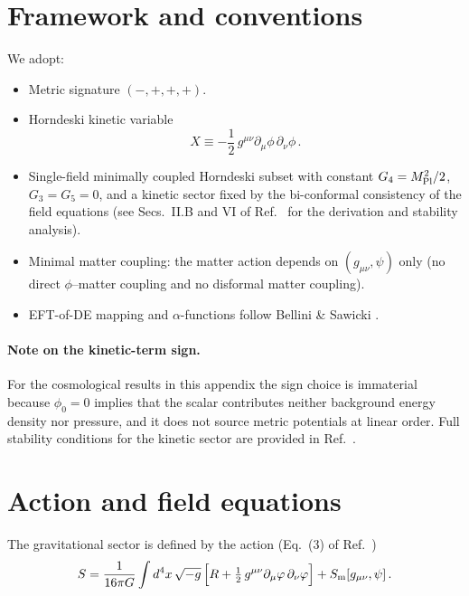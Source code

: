 \documentclass[11pt]{article}
\newcommand{\Mpl}{M_{\rm Pl}}
\begin{document}
\section{Framework and conventions}
\label{sec:conventions}

We adopt:
\begin{itemize}
\item Metric signature $(-,+,+,+)$.
\item Horndeski kinetic variable
\begin{equation}
X \equiv -\frac{1}{2}\,g^{\mu\nu}\partial_\mu\phi\,\partial_\nu\phi\,.
\end{equation}
\item Single-field minimally coupled Horndeski subset with constant $G_4=\Mpl^2/2$,
$G_3=G_5=0$, and a kinetic sector fixed by the bi-conformal consistency of the field
equations (see Secs.~II.B and VI of Ref.~\cite{Lotishvili2026} for the derivation and
stability analysis).
\item Minimal matter coupling: the matter action depends on $(g_{\mu\nu},\psi)$ only
(no direct $\phi$--matter coupling and no disformal matter coupling).
\item EFT-of-DE mapping and $\alpha$-functions follow Bellini \& Sawicki \cite{BelliniSawicki2014}.
\end{itemize}

\paragraph{Note on the kinetic-term sign.}
For the cosmological results in this appendix the sign choice is immaterial because
$\phi_0=0$ implies that the scalar contributes neither background energy density nor
pressure, and it does not source metric potentials at linear order. Full stability
conditions for the kinetic sector are provided in Ref.~\cite{Lotishvili2026}.

\section{Action and field equations}
\label{sec:action_app9}

The gravitational sector is defined by the action (Eq.~(3) of Ref.~\cite{Lotishvili2026})
\begin{equation}
S = \frac{1}{16\pi G}\int d^4x\,\sqrt{-g}\,
\Bigl[R + \tfrac{1}{2}\,g^{\mu\nu}\partial_\mu\phi\,\partial_\nu\phi\Bigr]
+ S_{\rm m}[g_{\mu\nu},\psi]\,.
\label{eq:action_app9}
\end{equation}
\end{document}
